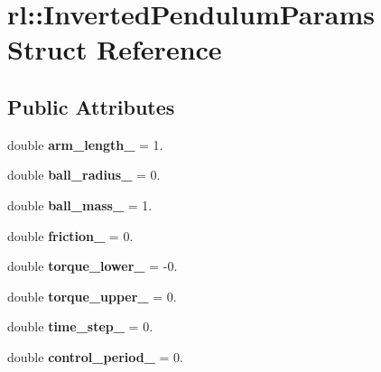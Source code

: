 \hypertarget{structrl_1_1_inverted_pendulum_params}{}\section{rl\+:\+:Inverted\+Pendulum\+Params Struct Reference}
\label{structrl_1_1_inverted_pendulum_params}
\subsection*{Public Attributes}
\begin{DoxyCompactItemize}
\item 
\hypertarget{structrl_1_1_inverted_pendulum_params_aa3740df2ebb8cfa6b50a98e8f3ff45b5}{}\label{structrl_1_1_inverted_pendulum_params_aa3740df2ebb8cfa6b50a98e8f3ff45b5} 
double {\bfseries arm\+\_\+length\+\_\+} = 1.
\item 
\hypertarget{structrl_1_1_inverted_pendulum_params_a08c5cb3e29bab7210c79d90cefb66236}{}\label{structrl_1_1_inverted_pendulum_params_a08c5cb3e29bab7210c79d90cefb66236} 
double {\bfseries ball\+\_\+radius\+\_\+} = 0.
\item 
\hypertarget{structrl_1_1_inverted_pendulum_params_a537c61e8761707b0170b64b2a83ab9bb}{}\label{structrl_1_1_inverted_pendulum_params_a537c61e8761707b0170b64b2a83ab9bb} 
double {\bfseries ball\+\_\+mass\+\_\+} = 1.
\item 
\hypertarget{structrl_1_1_inverted_pendulum_params_a09baf94ced09a84a60d8d39d55a22f06}{}\label{structrl_1_1_inverted_pendulum_params_a09baf94ced09a84a60d8d39d55a22f06} 
double {\bfseries friction\+\_\+} = 0.
\item 
\hypertarget{structrl_1_1_inverted_pendulum_params_aeb9915bac0287412f3ab1ea1c004814b}{}\label{structrl_1_1_inverted_pendulum_params_aeb9915bac0287412f3ab1ea1c004814b} 
double {\bfseries torque\+\_\+lower\+\_\+} = -\/0.
\item 
\hypertarget{structrl_1_1_inverted_pendulum_params_a95595734352a78d15b146551520560d2}{}\label{structrl_1_1_inverted_pendulum_params_a95595734352a78d15b146551520560d2} 
double {\bfseries torque\+\_\+upper\+\_\+} = 0.
\item 
\hypertarget{structrl_1_1_inverted_pendulum_params_a620a4c6c74a7f01abe37e561515e4818}{}\label{structrl_1_1_inverted_pendulum_params_a620a4c6c74a7f01abe37e561515e4818} 
double {\bfseries time\+\_\+step\+\_\+} = 0.
\item 
\hypertarget{structrl_1_1_inverted_pendulum_params_a842cea406d0572174d1f10bd7b391aed}{}\label{structrl_1_1_inverted_pendulum_params_a842cea406d0572174d1f10bd7b391aed} 
double {\bfseries control\+\_\+period\+\_\+} = 0.
\end{DoxyCompactItemize}


